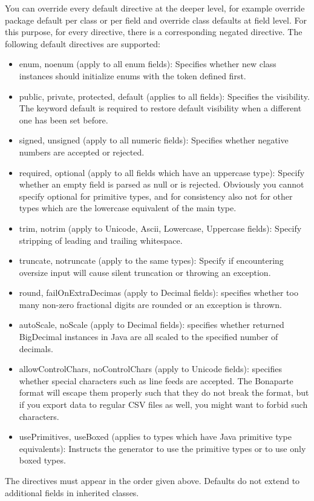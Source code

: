 \documentclass[11pt,a4paper,oneside]{article}
\begin{document}
\noindent You can override every default directive at the deeper level, for example override package default per class or per field and override class defaults
at field level. For this purpose, for every directive, there is a corresponding negated directive.
The following default directives are supported:
\begin{itemize}
   \item {\ttfamily enum}, {\ttfamily noenum} (apply to all enum fields): Specifies whether new class instances should
   initialize enums with the token defined first.
  \item {\ttfamily public}, {\ttfamily private}, {\ttfamily protected}, {\ttfamily default} (applies to all fields): Specifies the visibility. The keyword
   {\ttfamily default} is required to restore default visibility when a different one has been set before.
   \item {\ttfamily signed}, {\ttfamily unsigned} (apply to all numeric fields): Specifies whether negative numbers are accepted or rejected.
   \item {\ttfamily required}, {\ttfamily optional} (apply to all fields which have an uppercase type): Specify whether an empty field is parsed as
    {\ttfamily null} or is rejected. Obviously you cannot specify {\ttfamily optional} for primitive types, and for consistency also not for other types which
    are the lowercase equivalent of the main type. 
  \item {\ttfamily trim}, {\ttfamily notrim} (apply to {\ttfamily Unicode}, {\ttfamily Ascii}, {\ttfamily Lowercase}, {\ttfamily Uppercase} fields):
    Specify stripping of leading and trailing whitespace. 
  \item {\ttfamily truncate}, {\ttfamily notruncate} (apply to the same types): Specify if encountering oversize input will cause silent truncation or throwing an exception.
  \item {\ttfamily round}, {\ttfamily failOnExtraDecimas} (apply to {\ttfamily Decimal} fields): specifies whether too many
  non-zero fractional digits are rounded or an exception is thrown.
  \item {\ttfamily autoScale}, {\ttfamily noScale} (apply to {\ttfamily Decimal} fields): specifies
  whether returned {\ttfamily BigDecimal} instances in Java are all scaled to the specified number of decimals.
  \item {\ttfamily allowControlChars}, {\ttfamily noControlChars} (apply to {\ttfamily Unicode} fields): specifies whether special characters such as line feeds are accepted.
    The Bonaparte format will escape them properly such that they do not break the format, but if you export data to regular CSV files as well, you might want to
    forbid such characters.
  \item {\ttfamily usePrimitives}, {\ttfamily useBoxed} (applies to types which have Java primitive type equivalents): Instructs the generator to use the primitive types
    or to use only boxed types. 
\end{itemize}
The directives must appear in the order given above. Defaults do not extend to additional fields in inherited classes.
\end{document}
